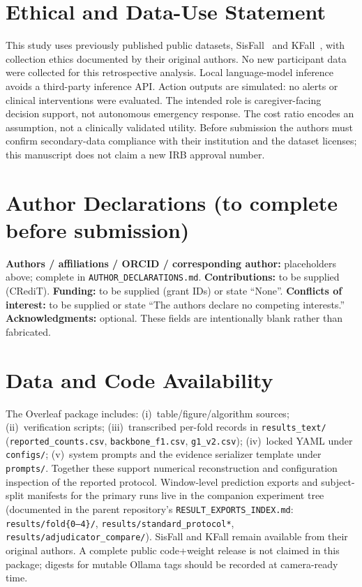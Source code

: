 \documentclass[journal]{IEEEtran}
\begin{document}
\section*{Ethical and Data-Use Statement}
This study uses previously published public datasets, SisFall~\cite{sisfall2017} and KFall~\cite{kfall2021}, with collection ethics documented by their original authors. No new participant data were collected for this retrospective analysis. Local language-model inference avoids a third-party inference API. Action outputs are simulated: no alerts or clinical interventions were evaluated. The intended role is caregiver-facing decision support, not autonomous emergency response. The cost ratio encodes an assumption, not a clinically validated utility. Before submission the authors must confirm secondary-data compliance with their institution and the dataset licenses; this manuscript does not claim a new IRB approval number.

\section*{Author Declarations (to complete before submission)}
\label{sec:authordecls}
\textbf{Authors / affiliations / ORCID / corresponding author:} placeholders above; complete in \texttt{AUTHOR\_DECLARATIONS.md}.
\textbf{Contributions:} to be supplied (CRediT).
\textbf{Funding:} to be supplied (grant IDs) or state ``None''.
\textbf{Conflicts of interest:} to be supplied or state ``The authors declare no competing interests.''
\textbf{Acknowledgments:} optional.
These fields are intentionally blank rather than fabricated.

\section*{Data and Code Availability}
The Overleaf package includes: (i)~table/figure/algorithm sources; (ii)~verification scripts; (iii)~transcribed per-fold records in \texttt{results\_text/} (\texttt{reported\_counts.csv}, \texttt{backbone\_f1.csv}, \texttt{g1\_v2.csv}); (iv)~locked YAML under \texttt{configs/}; (v)~system prompts and the evidence serializer template under \texttt{prompts/}. Together these support numerical reconstruction and configuration inspection of the reported protocol. Window-level prediction exports and subject-split manifests for the primary runs live in the companion experiment tree (documented in the parent repository's \texttt{RESULT\_EXPORTS\_INDEX.md}: \texttt{results/fold\{0--4\}/}, \texttt{results/standard\_protocol*}, \texttt{results/adjudicator\_compare/}). SisFall and KFall remain available from their original authors. A complete public code+weight release is not claimed in this package; digests for mutable Ollama tags should be recorded at camera-ready time.
\end{document}
